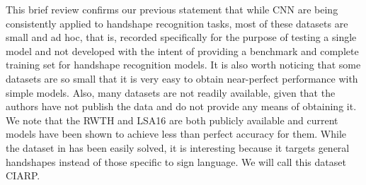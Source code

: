 This brief review confirms our previous statement that  while CNN are being consistently applied to handshape recognition tasks, most of these datasets are small and ad hoc, that is, recorded specifically for the purpose of testing a single model and not developed with the intent of providing a benchmark and complete training set for handshape recognition models. It is also worth noticing that some datasets are so small that it is very easy to obtain near-perfect performance with simple models. Also, many datasets are not readily available,  given that the authors have not publish the data and do not provide any means of obtaining it.  We note that the RWTH and LSA16 are both publicly available and current models have been shown to achieve less than perfect accuracy for them.  While the dataset in \cite{ciarp2018}  has been easily solved,  it is interesting because it targets general handshapes instead of those specific to sign language. We will call this dataset CIARP.



    